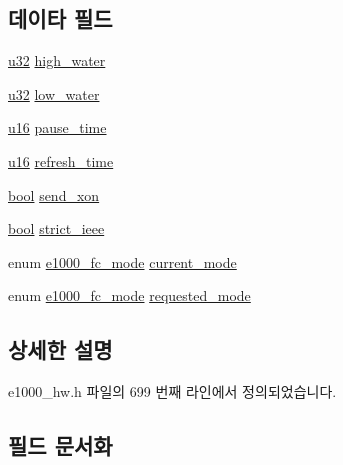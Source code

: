 \subsection*{데이타 필드}
\begin{DoxyCompactItemize}
\item 
\hyperlink{lib_2igb_2e1000__osdep_8h_a64e91c10a0d8fb627e92932050284264}{u32} \hyperlink{structe1000__fc__info_a0da8b901118488909e4b20caccfc6155}{high\+\_\+water}
\item 
\hyperlink{lib_2igb_2e1000__osdep_8h_a64e91c10a0d8fb627e92932050284264}{u32} \hyperlink{structe1000__fc__info_a2c806866e5062d3e1b1b9bad770c9f28}{low\+\_\+water}
\item 
\hyperlink{lib_2igb_2e1000__osdep_8h_acdc9cf0314be0ae5a01d6d4379a95edd}{u16} \hyperlink{structe1000__fc__info_af321c6d9439f591c76c928285f0495db}{pause\+\_\+time}
\item 
\hyperlink{lib_2igb_2e1000__osdep_8h_acdc9cf0314be0ae5a01d6d4379a95edd}{u16} \hyperlink{structe1000__fc__info_a13b2e207bbd833df8f9832a62268d0ca}{refresh\+\_\+time}
\item 
\hyperlink{avb__gptp_8h_af6a258d8f3ee5206d682d799316314b1}{bool} \hyperlink{structe1000__fc__info_a029854032b76190b8c61c989a8dacc5e}{send\+\_\+xon}
\item 
\hyperlink{avb__gptp_8h_af6a258d8f3ee5206d682d799316314b1}{bool} \hyperlink{structe1000__fc__info_a45655a898feb7af877f7e18f414cf188}{strict\+\_\+ieee}
\item 
enum \hyperlink{kmod_2igb_2e1000__hw_8h_a945f7c82643f147dea2193863639dfef}{e1000\+\_\+fc\+\_\+mode} \hyperlink{structe1000__fc__info_a7ff9ae5cd1a7fb9d4f208bd840f758f0}{current\+\_\+mode}
\item 
enum \hyperlink{kmod_2igb_2e1000__hw_8h_a945f7c82643f147dea2193863639dfef}{e1000\+\_\+fc\+\_\+mode} \hyperlink{structe1000__fc__info_a563a5640b5e1e50ba7f733b658f1f356}{requested\+\_\+mode}
\end{DoxyCompactItemize}


\subsection{상세한 설명}


e1000\+\_\+hw.\+h 파일의 699 번째 라인에서 정의되었습니다.



\subsection{필드 문서화}
